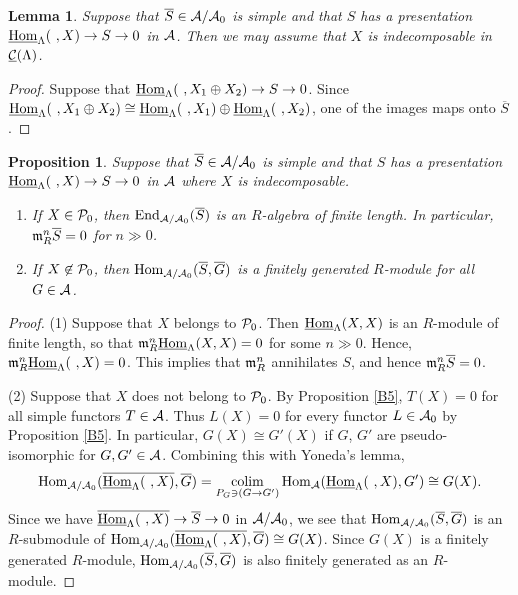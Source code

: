 \documentclass[11pt]{amsart}
\newtheorem{lemma}[theorem]{Lemma}
\newtheorem{proposition}[theorem]{Proposition}
\theoremstyle{definition}
\numberwithin{equation}{section}
\begin{document}
\begin{lemma}\label{B7}
Suppose that $\overline{S} \in \AA/ \AA_0$ is simple and that $S$ has a presentation $\sHomL(\ ,  X) \to S \to 0$ in $\AA$. 
Then we may assume that $X$ is indecomposable in $\sCML$. 
\end{lemma}


\begin{proof}
Suppose that $\sHomL (\ ,  X_1 \oplus X_2) \to S \to 0$. 
Since $\sHomL (\ ,  X_1 \oplus X_2) \cong \sHomL (\ ,  X_1) \oplus \sHomL (\ ,  X_2)$, one of the images maps onto $\overline{S}$. 
\end{proof}




\begin{proposition}\label{B8}
Suppose that $\overline{S} \in \AA/ \AA_0$ is simple and that $S$ has a presentation $\sHomL(\ ,  X) \to S \to 0$ in $\AA$ where $X$ is indecomposable. 
\begin{enumerate}[\rm(1)]
\item If $X \in \PP_0$, then $\End_{\AA/\AA_0} (\overline{S})$ is an $R$-algebra of finite length. 
In particular, $\m_R ^n \overline{S} = 0$ for $n \gg 0$.  
\item If $X \not\in \PP_0$, then $\Hom_{\AA/ \AA_0} (\overline{S}, \overline{G})$ is a finitely generated $R$-module for all $G \in \AA$. 
\end{enumerate}
\end{proposition}


\begin{proof}
(1) Suppose that $X$ belongs to $\PP_0$. 
Then $\sHomL (X, X)$ is an $R$-module of finite length, so that $\m_R ^n \sHomL (X, X) = 0$ for some $n\gg 0$. 
Hence, $\m_R ^n \sHomL(\ , X)=0$. 
This implies that $\m_R ^n$ annihilates $S$, and hence $ \m_R ^n \overline{S} = 0$. 


(2) Suppose that $X$ does not belong to $\PP_0$. 
By Proposition \ref{B5}, $T(X) = 0$ for all simple functors $T \in \AA$. 
Thus $L(X) = 0$ for every functor $L \in \AA_0$ by Proposition \ref{B5}. 
In particular, $G(X) \cong G'(X)$ if $G$, $G'$ are pseudo-isomorphic for $G, G' \in \AA$. 
Combining this with Yoneda's lemma,   
$$
\Hom_{\AA / \AA_0} (\overline{\sHomL (\ ,  X)}, \overline{G}) = \colim_{P_G \ni (G \to G')} \Hom_{\AA} ({\sHomL (\ ,  X)}, G') \cong G(X). 
$$
Since we have $\overline{\sHomL (\ ,  X)} \to \overline{S} \to 0$ in $\AA / \AA_0$, we see that $\Hom_{\AA / \AA_0} (\overline{S}, \overline{G})$ is an $R$-submodule of $\Hom_{\AA / \AA_0} (\overline{\sHomL (\ ,  X)}, \overline{G}) \cong G(X)$. 
Since $G(X)$ is a finitely generated $R$-module, $\Hom_{\AA / \AA_0} (\overline{S}, \overline{G})$ is also finitely generated as an $R$-module. 
\end{proof}
\end{document}
